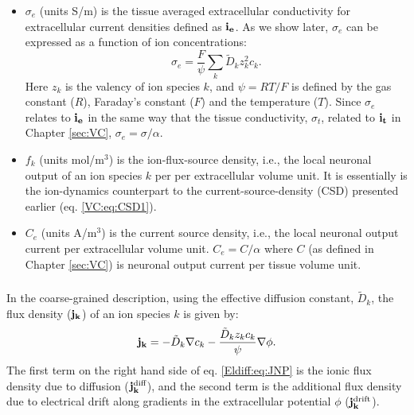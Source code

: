 \begin{itemize}
\item $\sigma_e$ (units S/m) is the tissue averaged extracellular conductivity for extracellular current densities defined as ${\bf i_e}$. As we show later, $\sigma_e$ can be expressed as a function of ion concentrations:
\begin{equation}
\sigma_e = \frac{F}{\psi}\sum_{k} \tilde{D}_k z_{k}^2 c_{k}.
\label{Eldiff:eq:sigma1}
\end{equation}
Here $z_{k}$ is the valency of ion species $k$, and $\psi=RT/F$ is defined by the gas constant ($R$), Faraday's constant ($F$) and the temperature ($T$). Since $\sigma_e$ relates to ${\bf i_e}$ in the same way that the tissue conductivity, $\sigma_t$, related to ${\bf i_t}$ in Chapter \ref{sec:VC}, $\sigma_e = \sigma /\alpha$.

\item $f_k$ (units mol/m$^3$) is the ion-flux-source density, i.e., the local neuronal output of an ion species $k$ per per extracellular volume unit. It is essentially is the ion-dynamics counterpart to the current-source-density (CSD) presented earlier (eq. \ref{VC:eq:CSD1}).

\item $C_e$ (units A/m$^3$) is the current source density, i.e., the local neuronal output current per extracellular volume unit. $C_e = C/\alpha$ where $C$ (as defined in Chapter \ref{sec:VC}) is neuronal output current per tissue volume unit.
\end{itemize}


\subsubsection{}
\label{sec:Eldiff:ionconcentrationdynamics}
In the coarse-grained description, using the effective diffusion constant, $\tilde{D}_k$, the flux density (${\bf j_k}$) of an ion species $k$ is given by:
\begin{equation}
{\bf j_k} = - \tilde{D}_k {\bf \nabla} c_{k} - \frac{\tilde{D}_k z_k c_k}{\psi} {\bf \nabla} \phi.
\label{Eldiff:eq:JNP}
\end{equation}
The first term on the right hand side of eq. \ref{Eldiff:eq:JNP} is the ionic flux density due to diffusion (${\bf j_{k}^\text{diff}}$), and the second term is the additional flux density due to electrical drift along gradients in the extracellular potential $\phi$ (${\bf j_{k}^\text{drift}}$). 

